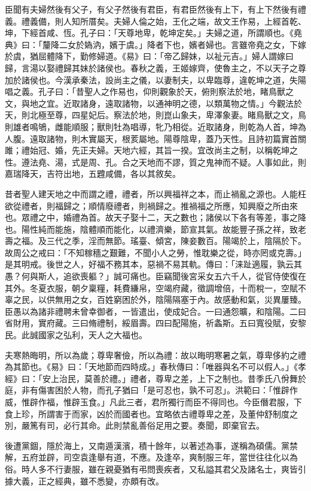 \begin{pinyinscope}
臣聞有夫婦然後有父子，有父子然後有君臣，有君臣然後有上下，有上下然後有禮義。禮義備，則人知所厝矣。夫婦人倫之始，王化之端，故文王作易，上經首乾、坤，下經首咸、恆。孔子曰：「天尊地卑，乾坤定矣。」夫婦之道，所謂順也。《堯典》曰：「釐降二女於媯汭，嬪于虞。」降者下也，嬪者婦也。言雖帝堯之女，下嫁於虞，猶屈體降下，勤修婦道。《易》曰：「帝乙歸妹，以祉元吉。」婦人謂嫁曰歸，言湯以娶禮歸其妹於諸侯也。春秋之義，王姬嫁齊，使魯主之，不以天子之尊加於諸侯也。今漢承秦法，設尚主之儀，以妻制夫，以卑臨尊，違乾坤之道，失陽唱之義。孔子曰：「昔聖人之作易也，仰則觀象於天，俯則察法於地，睹鳥獸之文，與地之宜。近取諸身，遠取諸物，以通神明之德，以類萬物之情。」今觀法於天，則北極至尊，四星妃后。察法於地，則崑山象夫，卑澤象妻。睹鳥獸之文，鳥則雄者鳴鴝，雌能順服；獸則牡為唱導，牝乃相從。近取諸身，則乾為人首，坤為人腹。遠取諸物，則木實屬天，根荄屬地。陽尊陰卑，蓋乃天性。且詩初篇實首關雎；禮始冠、婚，先正夫婦。天地六經，其旨一揆。宜改尚主之制，以稱乾坤之性。遵法堯、湯，式是周、孔。合之天地而不謬，質之鬼神而不疑。人事如此，則嘉瑞降天，吉符出地，五韙咸備，各以其敘矣。

昔者聖人建天地之中而謂之禮，禮者，所以興福祥之本，而止禍亂之源也。人能枉欲從禮者，則福歸之；順情廢禮者，則禍歸之。推禍福之所應，知興廢之所由來也。眾禮之中，婚禮為首。故天子娶十二，天之數也；諸侯以下各有等差，事之降也。陽性純而能施，陰體順而能化，以禮濟樂，節宣其氣。故能豐子孫之祥，致老壽之福。及三代之季，淫而無節。瑤臺、傾宮，陳妾數百。陽竭於上，陰隔於下。故周公之戒曰：「不知稼穡之艱難，不聞小人之勞，惟耽樂之從，時亦罔或克壽。」是其明戒。後世之人，好福不務其本，惡禍不易其軌。傳曰：「涞趾適履，孰云其愚？何與斯人，追欲喪軀？」誠可痛也。臣竊聞後宮采女五六千人，從官侍使復在其外。冬夏衣服，朝夕稟糧，耗費縑帛，空竭府藏，徵調增倍，十而稅一，空賦不辜之民，以供無用之女，百姓窮困於外，陰陽隔塞于內。故感動和氣，災異屢臻。臣愚以為諸非禮聘未曾幸御者，一皆遣出，使成妃合。一曰通怨曠，和陰陽。二曰省財用，實府藏。三曰脩禮制，綏眉壽。四曰配陽施，祈螽斯。五曰寬役賦，安黎民。此誠國家之弘利，天人之大福也。

夫寒熱晦明，所以為歲；尊卑奢儉，所以為禮：故以晦明寒暑之氣，尊卑侈約之禮為其節也。《易》曰：「天地節而四時成。」春秋傳曰：「唯器與名不可以假人。」《孝經》曰：「安上治民，莫善於禮。」禮者，尊卑之差，上下之制也。昔季氏八佾舞於庭，非有傷害困於人物，而孔子猶曰「是可忍也，孰不可忍」。洪範曰：「惟辟作威，惟辟作福，惟辟玉食。」凡此三者，君所獨行而臣不得同也。今臣僭君服，下食上珍，所謂害于而家，凶於而國者也。宜略依古禮尊卑之差，及董仲舒制度之別，嚴篤有司，必行其命。此則禁亂善俗足用之要。奏聞，即棄官去。

後遭黨錮，隱於海上，又南遁漢濱，積十餘年，以著述為事，遂稱為碩儒。黨禁解，五府並辟，司空袁逢舉有道，不應。及逢卒，爽制服三年，當世往往化以為俗。時人多不行妻服，雖在親憂猶有弔問喪疾者，又私謚其君父及諸名士，爽皆引據大義，正之經典，雖不悉變，亦頗有改。


\end{pinyinscope}

